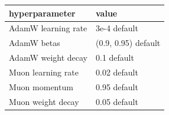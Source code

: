 \begin{tabular}{ll}
\toprule
hyperparameter & value \\
\midrule
AdamW learning rate & 3e-4 default \\
AdamW betas & (0.9, 0.95) default \\
AdamW weight decay & 0.1 default \\
Muon learning rate & 0.02 default \\
Muon momentum & 0.95 default \\
Muon weight decay & 0.05 default \\
\bottomrule
\end{tabular}
